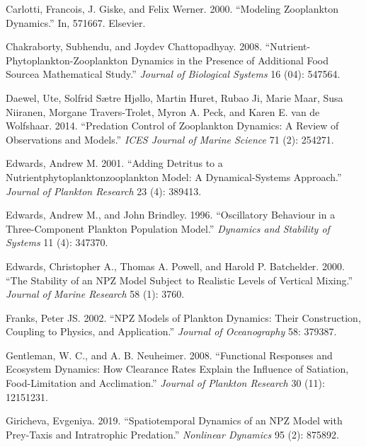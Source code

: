 \documentclass[
  letterpaper,
  DIV=11,
  numbers=noendperiod]{scrartcl}
\newlength{\cslhangindent}
\newlength{\cslentryspacingunit} %
\newenvironment{CSLReferences}[2] %
 {%
  \setlength{\parindent}{0pt}
  \ifodd #1
  \let\oldpar\par
  \def\par{\hangindent=\cslhangindent\oldpar}
  \fi
  \setlength{\parskip}{#2\cslentryspacingunit}
 }%
 {}
\begin{document}
\hypertarget{refs}{}
\begin{CSLReferences}{1}{0}
\leavevmode{}%
Carlotti, Francois, J. Giske, and Felix Werner. 2000. {``Modeling
Zooplankton Dynamics.''} In, 571667. Elsevier.

\leavevmode{}%
Chakraborty, Subhendu, and Joydev Chattopadhyay. 2008.
{``Nutrient-Phytoplankton-Zooplankton Dynamics in the Presence of
Additional Food Source{\textemdash}a Mathematical Study.''}
\emph{Journal of Biological Systems} 16 (04): 547564.

\leavevmode{}%
Daewel, Ute, Solfrid Sætre Hjøllo, Martin Huret, Rubao Ji, Marie Maar,
Susa Niiranen, Morgane Travers-Trolet, Myron A. Peck, and Karen E. van
de Wolfshaar. 2014. {``Predation Control of Zooplankton Dynamics: A
Review of Observations and Models.''} \emph{ICES Journal of Marine
Science} 71 (2): 254271.

\leavevmode{}%
Edwards, Andrew M. 2001. {``Adding Detritus to a
Nutrient{\textendash}phytoplankton{\textendash}zooplankton Model: A
Dynamical-Systems Approach.''} \emph{Journal of Plankton Research} 23
(4): 389413.

\leavevmode{}%
Edwards, Andrew M., and John Brindley. 1996. {``Oscillatory Behaviour in
a Three-Component Plankton Population Model.''} \emph{Dynamics and
Stability of Systems} 11 (4): 347370.

\leavevmode{}%
Edwards, Christopher A., Thomas A. Powell, and Harold P. Batchelder.
2000. {``The Stability of an NPZ Model Subject to Realistic Levels of
Vertical Mixing.''} \emph{Journal of Marine Research} 58 (1): 3760.

\leavevmode{}%
Franks, Peter JS. 2002. {``NPZ Models of Plankton Dynamics: Their
Construction, Coupling to Physics, and Application.''} \emph{Journal of
Oceanography} 58: 379387.

\leavevmode{}%
Gentleman, W. C., and A. B. Neuheimer. 2008. {``Functional Responses and
Ecosystem Dynamics: How Clearance Rates Explain the Influence of
Satiation, Food-Limitation and Acclimation.''} \emph{Journal of Plankton
Research} 30 (11): 12151231.

\leavevmode{}%
Giricheva, Evgeniya. 2019. {``Spatiotemporal Dynamics of an NPZ Model
with Prey-Taxis and Intratrophic Predation.''} \emph{Nonlinear Dynamics}
95 (2): 875892.


\end{CSLReferences}
\end{document}
